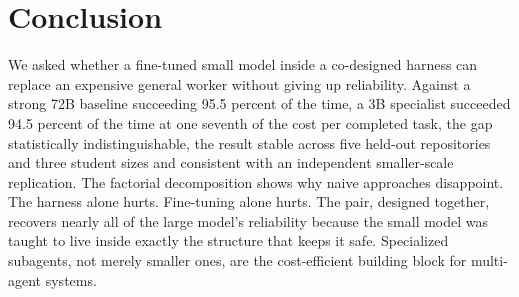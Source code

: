 \documentclass[11pt]{article}
\begin{document}
\section{Conclusion}

We asked whether a fine-tuned small model inside a co-designed harness can
replace an expensive general worker without giving up reliability. Against a
strong 72B baseline succeeding 95.5 percent of the time, a 3B specialist
succeeded 94.5 percent of the time at one seventh of the cost per completed
task, the gap statistically indistinguishable, the result stable across five
held-out repositories and three student sizes and consistent with an
independent smaller-scale replication. The factorial decomposition shows why
naive approaches disappoint. The harness alone hurts. Fine-tuning alone
hurts. The pair, designed together, recovers nearly all of the large model's
reliability because the small model was taught to live inside exactly the
structure that keeps it safe. Specialized subagents, not merely smaller ones,
are the cost-efficient building block for multi-agent systems.



\end{document}
